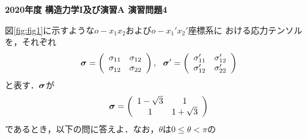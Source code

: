 \documentclass[10pt,a4j]{jarticle}
\newlength{\minitwocolumn}
\begin{document}
\newcommand{\fat}[1]{\mbox{\boldmath $#1$}}
\newcommand{\D}{\partial}
\newcommand{\w}{\omega}
\newcommand{\ga}{\alpha}
\newcommand{\gb}{\beta}
\newcommand{\gx}{\xi}
\newcommand{\gz}{\zeta}
\newcommand{\vhat}[1]{\hat{\fat{#1}}}
\newcommand{\spc}{\vspace{0.7\baselineskip}}
\newcommand{\halfspc}{\vspace{0.3\baselineskip}}

\pagestyle{empty}
\newcommand{\twofig}[2]
 {
   \begin{figure}[here]
     \begin{minipage}[t]{\minitwocolumn}
         \begin{center}   #1
         \end{center}
     \end{minipage}
         \hspace{\columnsep}
     \begin{minipage}[t]{\minitwocolumn}
         \begin{center} #2
         \end{center}
     \end{minipage}
   \end{figure}
 }
\begin{center}
	{\Large \bf 2020年度 構造力学I及び演習A 演習問題4 }
\end{center}
\vspace{15mm}
	図\ref{fig:fig1}に示すような$o-x_1 x_2$および$o-x_1'x_2'$座標系に
	おける応力テンソルを，それぞれ
\[
	\fat{\sigma}
	=
	\left( 
		\begin{array}{cc}
		\sigma_{11} & \sigma_{12} \\
		\sigma_{12} & \sigma_{22} 
		\end{array}
	\right)
	, 
	\ \
	\fat{\sigma}'
	=
	\left( 
		\begin{array}{cc}
		\sigma_{11}' & \sigma_{12}' \\
		\sigma_{12}' & \sigma_{22}'
		\end{array}
	\right)
\]
	と表す．$\fat{\sigma}$が
\begin{equation}
	\fat{\sigma}
	=
	\left( 
		\begin{array}{cc}
			1-\sqrt{3} & 1\\
			1 & 1+\sqrt{3} 
		\end{array}
	\right)
	\label{eqn:sigma}
\end{equation}
であるとき，以下の問に答えよ．なお，$\theta$は$0 \leq \theta < \pi$の
\end{document}
